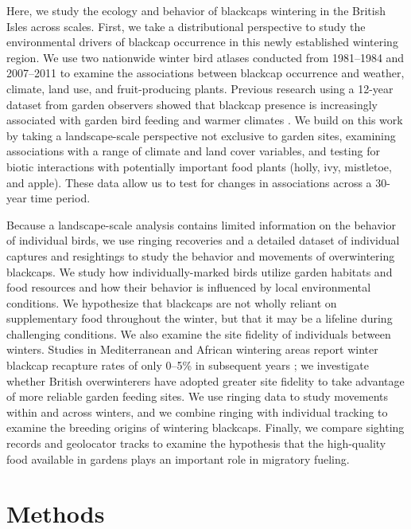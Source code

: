 \documentclass[a4paper, twoside]{templates/ociamthesis}
\begin{document}
Here, we study the ecology and behavior of blackcaps wintering in the British Isles across scales. First, we take a distributional perspective to study the environmental drivers of blackcap occurrence in this newly established wintering region. We use two nationwide winter bird atlases conducted from 1981--1984 \autocite{blandBlackcap1986} and 2007--2011 \autocite{balmer2013bird} to examine the associations between blackcap occurrence and weather, climate, land use, and fruit-producing plants. Previous research using a 12-year dataset from garden observers showed that blackcap presence is increasingly associated with garden bird feeding and warmer climates \autocite{plummerSupplementaryFeedingGardens2015}. We build on this work by taking a landscape-scale perspective not exclusive to garden sites, examining associations with a range of climate and land cover variables, and testing for biotic interactions with potentially important food plants (holly, ivy, mistletoe, and apple). These data allow us to test for changes in associations across a 30-year time period.

Because a landscape-scale analysis contains limited information on the behavior of individual birds, we use ringing recoveries and a detailed dataset of individual captures and resightings to study the behavior and movements of overwintering blackcaps. We study how individually-marked birds utilize garden habitats and food resources and how their behavior is influenced by local environmental conditions. We hypothesize that blackcaps are not wholly reliant on supplementary food throughout the winter, but that it may be a lifeline during challenging conditions. We also examine the site fidelity of individuals between winters. Studies in Mediterranean and African wintering areas report winter blackcap recapture rates of only 0--5\% in subsequent years \autocite{cuadradoAllBlackcapsSylvia1995,cuadradoYearYearRecurrence1992,kingSiteFidelityRecurrence2001,loveiMigrationWinteringBlackcap1985}; we investigate whether British overwinterers have adopted greater site fidelity to take advantage of more reliable garden feeding sites. We use ringing data to study movements within and across winters, and we combine ringing with individual tracking to examine the breeding origins of wintering blackcaps. Finally, we compare sighting records and geolocator tracks to examine the hypothesis that the high-quality food available in gardens plays an important role in migratory fueling.

\hypertarget{methods-1}{%
\section{Methods}\label{methods-1}}
\end{document}
